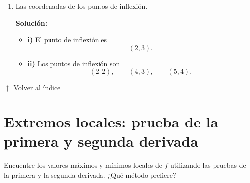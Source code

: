 \documentclass[12pt]{article}
\newcommand{\solucion}{%
    \vspace{0.8em}%
    \textbf{Solución:}%
}
\newcommand{\volverindice}{%
    \vspace{1em}%
    \begin{flushright}%
        \hyperlink{indice}{\small $\uparrow$ Volver al índice}%
    \end{flushright}%
}
\begin{document}
\begin{enumerate}[label=\alph*.-]
    \solucion

    \begin{itemize}
        \item \textbf{i)} $f$ es cóncava hacia abajo en
        \[
        (2,4)\cup(4,6).
        \]

        \item \textbf{ii)} $f$ es cóncava hacia abajo en
        \[
        (0,2)\cup(4,5).
        \]
    \end{itemize}


    \item Las coordenadas de los puntos de inflexión.

    \solucion

    \begin{itemize}
        \item \textbf{i)} El punto de inflexión es
        \[
        (2,3).
        \]

        \item \textbf{ii)} Los puntos de inflexión son
        \[
        (2,2),\qquad (4,3),\qquad (5,4).
        \]
    \end{itemize}

\end{enumerate}

\volverindice

\newpage

\section{Extremos locales: prueba de la primera y segunda derivada}

Encuentre los valores máximos y mínimos locales de $f$ utilizando las pruebas de la primera y la segunda derivada. ¿Qué método prefiere?
\end{document}
